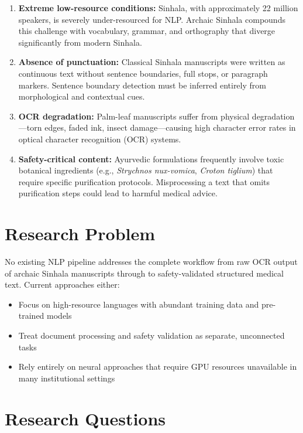 \documentclass[12pt, a4paper, twoside]{report}
\begin{document}
\begin{enumerate}[label=(\roman*)]
    \item \textbf{Extreme low-resource conditions:} Sinhala, with approximately 22 million speakers, is severely under-resourced for NLP. Archaic Sinhala compounds this challenge with vocabulary, grammar, and orthography that diverge significantly from modern Sinhala.
    
    \item \textbf{Absence of punctuation:} Classical Sinhala manuscripts were written as continuous text without sentence boundaries, full stops, or paragraph markers. Sentence boundary detection must be inferred entirely from morphological and contextual cues.
    
    \item \textbf{OCR degradation:} Palm-leaf manuscripts suffer from physical degradation—torn edges, faded ink, insect damage—causing high character error rates in optical character recognition (OCR) systems.
    
    \item \textbf{Safety-critical content:} Ayurvedic formulations frequently involve toxic botanical ingredients (e.g., \textit{Strychnos nux-vomica}, \textit{Croton tiglium}) that require specific purification protocols. Misprocessing a text that omits purification steps could lead to harmful medical advice.
\end{enumerate}

\section{Research Problem}
\label{sec:problem}

No existing NLP pipeline addresses the complete workflow from raw OCR output of archaic Sinhala manuscripts through to safety-validated structured medical text. Current approaches either:
\begin{itemize}
    \item Focus on high-resource languages with abundant training data and pre-trained models
    \item Treat document processing and safety validation as separate, unconnected tasks
    \item Rely entirely on neural approaches that require GPU resources unavailable in many institutional settings
\end{itemize}

\section{Research Questions}
\label{sec:rqs}
\end{document}
